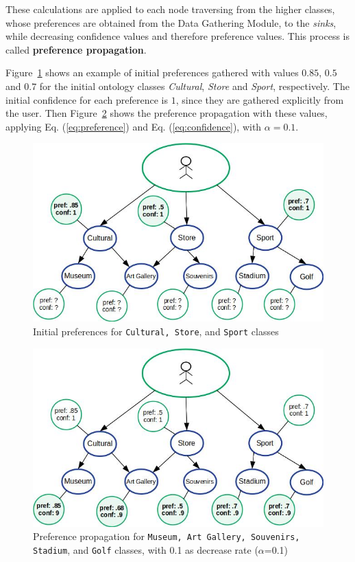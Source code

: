 These calculations are applied to each node traversing from the higher classes, whose preferences are obtained from the Data Gathering Module, to the \textit{sinks}, while decreasing confidence values and therefore preference values. 
This process is called \textbf{preference propagation}. 

Figure~\ref{fig:initial_pref} shows an example of initial preferences gathered with values $0.85$, $0.5$ and $0.7$ for the initial ontology classes \textit{Cultural}, \textit{Store} and \textit{Sport}, respectively. The initial confidence for each preference is $1$, since they are gathered explicitly from the user. Then Figure~\ref{fig:pref_prop} shows the preference propagation with these values, applying Eq. (\ref{eq:preference}) and Eq. (\ref{eq:confidence}), with $\alpha = 0.1$.

\begin{figure}[h]
\centering
\includegraphics[scale=0.5]{draws/initial_pref.jpg}
\caption{Initial preferences for {\tt Cultural, Store}, and {\tt Sport} classes}
\label{fig:initial_pref}
\end{figure}

\begin{figure}[h]
\centering
\includegraphics[scale=0.5]{draws/pref_spred.jpg}
\caption{Preference propagation for {\tt Museum, Art Gallery, Souvenirs, Stadium}, and {\tt Golf} classes, with 0.1 as decrease rate ($\alpha$=0.1)}
\label{fig:pref_prop}
\end{figure}

